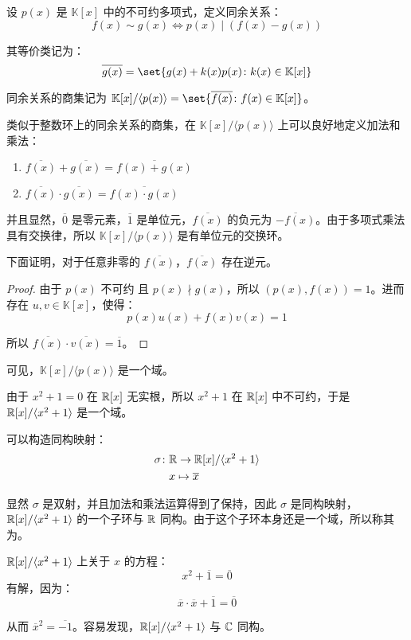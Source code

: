 设 $p(x)$ 是 $\mathbb K[x]$ 中的不可约多项式，定义同余关系：
$$
f(x) \sim g(x) \Longleftrightarrow p(x) \mid (f(x) - g(x))
$$

其等价类记为：
$$
\overline{g(x)} = \set{g(x) + k(x) p(x) \colon k(x) \in \mathbb K[x]}
$$

同余关系的商集记为 $\mathbb K[x] / \langle p(x) \rangle = \set{\overline{f(x)} \colon f(x) \in \mathbb K[x]}$。

类似于整数环上的同余关系的商集，在 $\mathbb K[x] / \langle p(x) \rangle$ 上可以良好地定义加法和乘法：
\begin{enumerate}
	\item $\overline{f(x)} + \overline{g(x)} = \overline{f(x) + g(x)}$
	\item $\overline{f(x)} \cdot \overline{g(x)} = \overline{f(x) \cdot g(x)}$
\end{enumerate}

并且显然，$\overline 0$ 是零元素，$\overline 1$ 是单位元，$\overline{f(x)}$ 的负元为 $\overline{-f(x)}$。由于多项式乘法具有交换律，所以 $\mathbb K[x] / \langle p(x) \rangle$ 是有单位元的交换环。

下面证明，对于任意非零的 $\overline{f(x)}$，$\overline{f(x)}$ 存在逆元。

\begin{proof}
	由于 $p(x)$ 不可约 且 $p(x) \nmid g(x)$，所以 $(p(x), f(x)) = 1$。进而存在 $u, v \in \mathbb K[x]$，使得：
	$$
	p(x) u(x) + f(x) v(x) = 1
	$$

	所以 $\overline{f(x)} \cdot \overline{v(x)} = \overline 1$。
\end{proof}

可见，$\mathbb K[x] / \langle p(x) \rangle$ 是一个域。

\begin{example}
	由于 $x^2 + 1 = 0$ 在 $\mathbb R[x]$ 无实根，所以 $x^2 + 1$ 在 $\mathbb R[x]$ 中不可约，于是 $\mathbb R[x] / \langle x^2 + 1 \rangle$ 是一个域。

	\bigskip

	可以构造同构映射：
	$$
	\begin{aligned}
		\sigma \colon & \mathbb R \to \mathbb R[x] / \langle x^2 + 1 \rangle
		\\&
		x \mapsto \overline x
	\end{aligned}
	$$

	显然 $\sigma$ 是双射，并且加法和乘法运算得到了保持，因此 $\sigma$ 是同构映射，$\mathbb R[x] / \langle x^2 + 1 \rangle$ 的一个子环与 $\mathbb R$ 同构。由于这个子环本身还是一个域，所以称其为\emph{}。

	$\mathbb R[x] / \langle x^2 + 1 \rangle$ 上关于 $x$ 的方程：
	$$
	x^2 + \overline 1 = \overline 0
	$$
	有解，因为：
	$$
	\overline x \cdot \overline x + \overline 1 = \overline 0
	$$

	从而 $\overline x^2 = \overline{-1}$。容易发现，$\mathbb R[x] / \langle x^2 + 1 \rangle$ 与 $\mathbb C$ 同构。
\end{example}